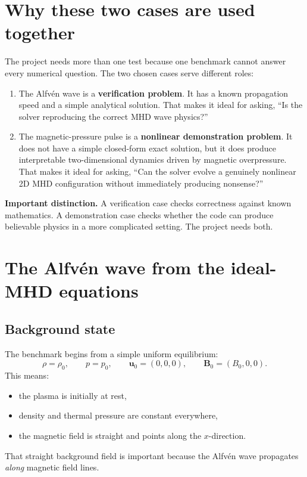 \documentclass[11pt]{article}
\newcommand{\uvec}{\mathbf{u}}
\newcommand{\Bvec}{\mathbf{B}}
\begin{document}
\section{Why these two cases are used together}
The project needs more than one test because one benchmark cannot answer every numerical question. The two chosen cases serve different roles:
\begin{enumerate}[leftmargin=1.8em]
    \item The Alfv\'en wave is a \textbf{verification problem}. It has a known propagation speed and a simple analytical solution. That makes it ideal for asking, ``Is the solver reproducing the correct MHD wave physics?''
    \item The magnetic-pressure pulse is a \textbf{nonlinear demonstration problem}. It does not have a simple closed-form exact solution, but it does produce interpretable two-dimensional dynamics driven by magnetic overpressure. That makes it ideal for asking, ``Can the solver evolve a genuinely nonlinear 2D MHD configuration without immediately producing nonsense?''
\end{enumerate}

\begin{physicsbox}
\textbf{Important distinction.} A verification case checks correctness against known mathematics. A demonstration case checks whether the code can produce believable physics in a more complicated setting. The project needs both.
\end{physicsbox}

\section{The Alfv\'en wave from the ideal-MHD equations}

\subsection{Background state}
The benchmark begins from a simple uniform equilibrium:
\begin{equation}
\rho = \rho_0, \qquad
p = p_0, \qquad
\uvec_0 = (0,0,0), \qquad
\Bvec_0 = (B_0,0,0).
\label{eq:m2-bg}
\end{equation}
This means:
\begin{itemize}[leftmargin=1.8em]
    \item the plasma is initially at rest,
    \item density and thermal pressure are constant everywhere,
    \item the magnetic field is straight and points along the $x$-direction.
\end{itemize}
That straight background field is important because the Alfv\'en wave propagates \emph{along} magnetic field lines.
\end{document}
